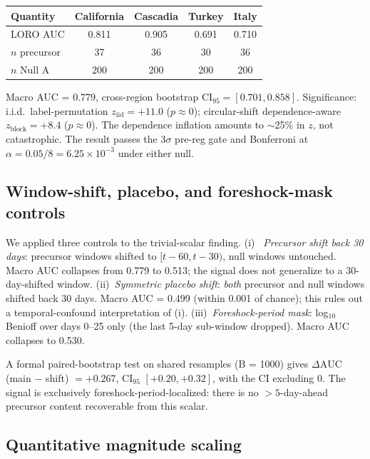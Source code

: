 \documentclass[11pt]{article}
\begin{document}
\begin{center}
\begin{tabular}{lcccc}
\toprule
Quantity & California & Cascadia & Turkey & Italy \\
\midrule
LORO AUC               & 0.811 & 0.905 & 0.691 & 0.710 \\
$n$ precursor          & 37    & 36    & 30    & 36    \\
$n$ Null A             & 200   & 200   & 200   & 200   \\
\bottomrule
\end{tabular}
\end{center}

Macro AUC = $0.779$, cross-region bootstrap $\mathrm{CI}_{95} = [0.701,
0.858]$. Significance: i.i.d.\ label-permutation $z_\mathrm{iid} =
+11.0$ ($p \approx 0$); circular-shift dependence-aware
$z_\mathrm{block} = +8.4$ ($p \approx 0$). The dependence inflation
amounts to $\sim$25\% in $z$, not catastrophic. The result passes the
3$\sigma$ pre-reg gate and Bonferroni at $\alpha = 0.05/8 = 6.25
\times 10^{-3}$ under either null.

\subsection{Window-shift, placebo, and foreshock-mask controls}
\label{sec:results-controls}

We applied three controls to the trivial-scalar finding. (i)~\emph{
Precursor shift back 30 days}: precursor windows shifted to
$[t-60, t-30)$, null windows untouched. Macro AUC collapses from 0.779
to 0.513; the signal does not generalize to a 30-day-shifted window.
(ii)~\emph{Symmetric placebo shift}: \emph{both} precursor and null
windows shifted back 30 days. Macro AUC = 0.499 (within 0.001 of
chance); this rules out a temporal-confound interpretation of (i).
(iii)~\emph{Foreshock-period mask}: log$_{10}$ Benioff over days 0--25
only (the last 5-day sub-window dropped). Macro AUC collapses to 0.530.

A formal paired-bootstrap test on shared resamples (B = 1000) gives
$\Delta\mathrm{AUC}$ (main $-$ shift) $= +0.267$, $\mathrm{CI}_{95}$
$[+0.20, +0.32]$, with the CI excluding 0. The signal is exclusively
foreshock-period-localized: there is no $> 5$-day-ahead precursor
content recoverable from this scalar.

\subsection{Quantitative magnitude scaling}
\label{sec:results-magnitude}
\end{document}
